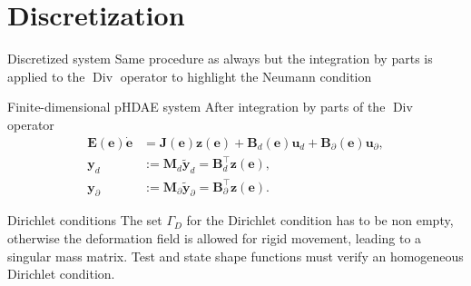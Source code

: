 \documentclass[aspectratio=169]{ISAE-Beamer}
\DeclareMathOperator*{\Div}{Div}
\begin{document}
\section{Discretization}

\begin{frame}{Discretized system}
	Same procedure as always but the integration by parts is applied to the $\Div$ operator to highlight the Neumann condition
	\begin{exampleblock}{Finite-dimensional pHDAE system}
		\setlength{\abovedisplayskip}{3pt}
		\setlength{\belowdisplayskip}{3pt}
		After integration by parts of the $\Div$ operator
		\begin{equation*}
		\begin{aligned}
		\mathbf{E}(\mathbf{e}) \dot{\mathbf{e}} &= \mathbf{J}(\mathbf{e}) \mathbf{z}(\mathbf{e}) + \mathbf{B}_d(\mathbf{e}) \mathbf{u}_d + \mathbf{B}_\partial(\mathbf{e}) \mathbf{u}_\partial, \\
		\mathbf{y}_d &:= \mathbf{M}_d \widetilde{\mathbf{y}}_d = \mathbf{B}_d^\top \mathbf{z}(\mathbf{e}),  \\
		\mathbf{y}_\partial &:= \mathbf{M}_\partial \widetilde{\mathbf{y}}_\partial = \mathbf{B}_\partial^\top \mathbf{z}(\mathbf{e}).
		\end{aligned}
		\end{equation*}
	\end{exampleblock}
	
	\begin{block}{Dirichlet conditions}
		The set $\Gamma_D$ for the Dirichlet condition has to be non empty, otherwise the deformation field is allowed for rigid movement, leading to a singular mass matrix. Test and state shape functions must verify an homogeneous Dirichlet condition. 
	\end{block}
\end{frame}
\end{document}
